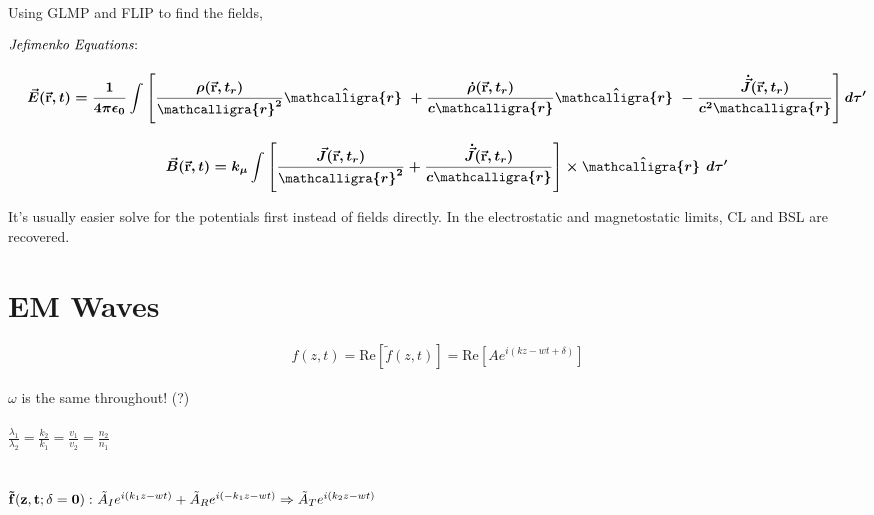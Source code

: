 \documentclass[12pt]{article}
\newcommand{\scripty}[1]{\ensuremath{\mathcalligra{#1}}}
\newcommand{\cursr}{\scripty{r}}		%
\newcommand{\cursrr}{\scripty{r}\ }
\newcommand{\hs}{\hspace{1pt}} %
\begin{document}
\begin{minipage}[t]{0.49\textwidth}
	Using GLMP and FLIP to find the fields,

	\vspace{15pt}
	\(\boldsymbol{
		\begin{aligned}
			&\text{\emph{Jefimenko Equations}:}\\[10pt]
			&\ \ \ \ \begin{gathered}
				\vec{E}( \vec{ \mathbf{r} }, t) = \frac{1}{4 \pi \epsilon_0} 
					\int \left [ \frac{ \rho ( \vec{ \mathbf{r} }, t_r ) }{\cursr^2} \hat{\cursrr} 
					+ \frac{ \dot{\rho} ( \vec{ \mathbf{r} }, t_r ) }{c \cursr} \hat{\cursrr} 
					- \frac{ \dot{\vec{J}} ( \vec{ \mathbf{r} }, t_r ) }{c^2 \cursr} \right ] d\tau'
					\\[10pt]
				\vec{B}( \vec{ \mathbf{r} }, t) = k_\mu
					\int \left [ \frac{ \vec{J} ( \vec{ \mathbf{r} }, t_r ) }{\cursr^2} 
					+ \frac{ \dot{ \vec{J} } ( \vec{ \mathbf{r} }, t_r ) }{c \cursr} \right ] \times \hat{\cursrr} \hs d\tau'
			\end{gathered}
		\end{aligned}
	}\)

	\vspace{20pt}
	It's usually easier solve for the potentials first instead of fields directly. In 
	the electrostatic and magnetostatic limits, CL and BSL are recovered.
\end{minipage}


\newpage
\section{EM Waves}

\[ f(z,t) = \text{Re}[ \tilde f(z,t) ] = \text{Re}\left[ Ae^{i(kz-wt+\delta)} \right] \] \\
$\omega$ is the same throughout! (?) \\ \\
$\displaystyle \frac{\lambda_1}{\lambda_2} = \frac{k_2}{k_1} = \frac{v_1}{v_2} = \frac{n_2}{n_1}$ \\ \\ \\
${\bf \tilde f(z,t; \delta = 0): }\ \tilde A_I e^{ i(k_1z-wt) } + \tilde A_R e^{ i(-k_1z-wt) } \Rightarrow \tilde A_T e^{ i(k_2z-wt) }$ \\
\end{document}
